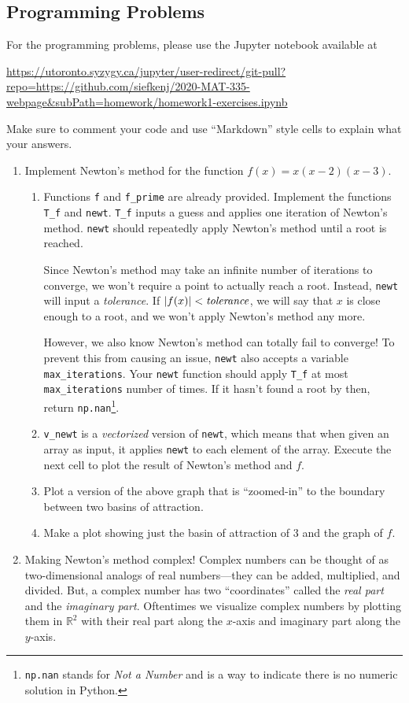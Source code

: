 \documentclass[letter]{article}
\newcommand{\R}{\mathbb{R}}
\begin{document}
	\subsection*{Programming Problems}
	For the programming problems, please use the Jupyter notebook available at

	\url{https://utoronto.syzygy.ca/jupyter/user-redirect/git-pull?repo=https://github.com/siefkenj/2020-MAT-335-webpage&subPath=homework/homework1-exercises.ipynb}

	Make sure to comment your code and use ``Markdown'' style cells to explain what your answers.

	\begin{enumerate}
		\item Implement Newton's method for the function $f(x)=x(x-2)(x-3)$.
			\begin{enumerate}
				\item Functions \verb|f| and \verb|f_prime| are already provided. Implement the functions
					\verb|T_f| and \verb|newt|. \verb|T_f| inputs a guess and applies one iteration
					of Newton's method. \verb|newt| should repeatedly apply Newton's method until a root
					is reached.

					Since Newton's method may take an infinite number of iterations to converge, we 
					won't require a point to actually reach a root. Instead, \verb|newt| will input a 
					\emph{tolerance}. If $|f(x)|<\text{\emph{tolerance}}$, we will say that $x$ is 
					close enough to a root, and we won't apply Newton's method any more.

					However, we also know Newton's method can totally fail to converge! To prevent this
					from causing an issue,
					\verb|newt| also accepts a variable \verb|max_iterations|. Your \verb|newt| function
					should apply \verb|T_f| at most \verb|max_iterations| number of times. If it hasn't found
					a root by then, return \verb|np.nan|\footnote{ {\tt np.nan} stands for \emph{Not a Number}
					and is a way to indicate there is no numeric solution in Python.}.
				\item \verb|v_newt| is a \emph{vectorized} version of \verb|newt|, which means that when given an
					array as input, it applies \verb|newt| to each element of the array. Execute the next cell
					to plot the result of Newton's method and $f$.
				\item Plot a version of the above graph that is ``zoomed-in'' to the boundary between two basins of attraction.
				\item Make a plot showing just the basin of attraction of $3$ and the graph of $f$.
			\end{enumerate}
		\item Making Newton's method complex!
			Complex numbers can be thought of as two-dimensional analogs of real numbers---they can be
			added, multiplied, and divided. But, a complex number has two ``coordinates'' called the \emph{real part}
			and the \emph{imaginary part}. Oftentimes we visualize complex numbers by plotting them in $\R^2$
			with their real part along the $x$-axis and imaginary part along the $y$-axis.


\end{enumerate}
\end{document}

